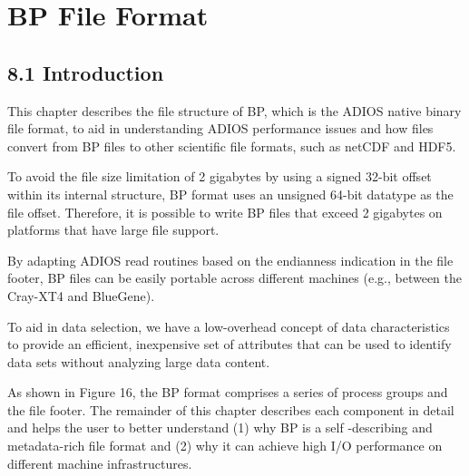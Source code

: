 \vspace{10pt}
\section{BP File Format}

\vspace{24pt}
\subsection*{{\large 8.1 }{\large \textbf{Introduction}}}

\vspace{10pt}
This chapter describes the file structure of BP, which is the ADIOS native binary 
file format, to aid in understanding ADIOS performance issues and how files convert 
from BP files to other scientific file formats, such as netCDF and HDF5.

\vspace{10pt}
To avoid the file size limitation of 2 gigabytes by using a signed 32-bit offset 
within its internal structure, BP format uses an unsigned 64-bit datatype as the 
file offset. Therefore, it is possible to write BP files that exceed 2 gigabytes 
on platforms that have large file support. 

\vspace{10pt}
By adapting ADIOS read routines based on the endianness indication in the file 
footer, BP files can be easily portable across different machines (e.g., between 
the Cray-XT4 and BlueGene). 

\vspace{10pt}
To aid in data selection, we have a low-overhead concept of data characteristics 
to provide an efficient, inexpensive set of attributes that can be used to identify 
data sets without analyzing large data content.

\vspace{10pt}
As shown in Figure 16, the BP format comprises a series of process groups and the 
file footer. The remainder of this chapter describes each component in detail and 
helps the user to better understand (1) why BP is a self -describing and metadata-rich 
file format and (2) why it can achieve high I/O performance on different machine 
infrastructures. 

